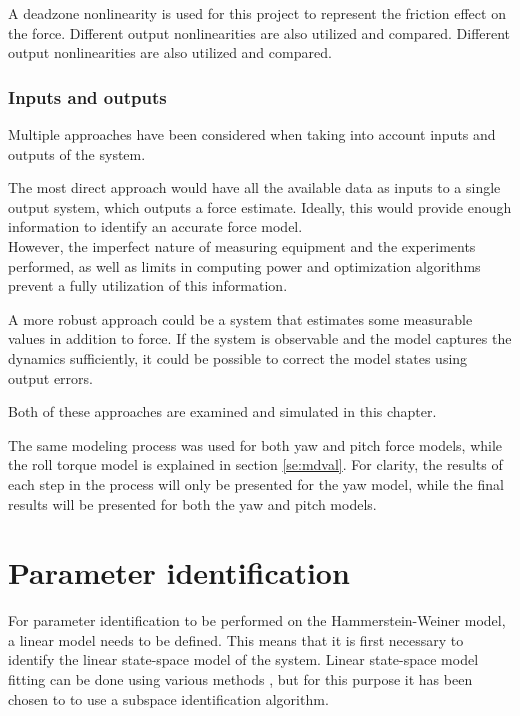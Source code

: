 A deadzone nonlinearity is used for this project to represent the friction effect on the force.
Different output nonlinearities are also utilized and compared.
Different output nonlinearities are also utilized and compared.

\subsubsection{Inputs and outputs}
Multiple approaches have been considered when taking into account inputs and outputs of the system.

The most direct approach would have all the available data as inputs to a single output system, which outputs a force estimate.
Ideally, this would provide enough information to identify an accurate force model.\\
However, the imperfect nature of measuring equipment and the experiments performed, as well as limits in computing power and optimization algorithms prevent a fully utilization of this information.

A more robust approach could be a system that estimates some measurable values in addition to force.%
If the system is observable and the model captures the dynamics sufficiently, it could be possible to correct the model states using output errors.

Both of these approaches are examined and simulated in this chapter.

The same modeling process was used for both yaw and pitch force models, while the roll torque model is explained in section \ref{se:mdval}.
For clarity, the results of each step in the process will only be presented for the yaw model, while the final results will be presented for both the yaw and pitch models. 

\section{Parameter identification}\label{sec:para_iden}

For parameter identification to be performed on the Hammerstein-Weiner model, a linear model needs to be defined.
This means that it is first necessary to identify the linear state-space model of the system.
Linear state-space model fitting can be done using various methods , but for this purpose it has been chosen to to use a subspace identification algorithm.

